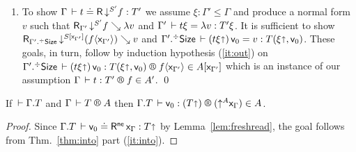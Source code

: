 \documentclass[acmsmall%
]{acmart}\settopmatter{printfolios=true}
\makeatletter
\newcommand{\LONGVERSION}[1]{}
\newenvironment{proof*}[1][\proofname]{\par
  \normalfont \topsep6\p@\@plus6\p@\relax
  \trivlist
  \item[\@proofindent\hskip\labelsep
        {\@proofnamefont #1\@addpunct{.}}]\ignorespaces
}{%
  \endtrivlist\@endpefalse
}
\makeatother
\begin{document}
{\begin{proof*}
\begin{caselist}
\begin{enumerate}
\item %
To show $\Gamma \,\vdash t \doteq \mathsf{R}\, \mathord{\downarrow^{S'}} f : T'$ we assume $\xi : \Gamma' \leq \Gamma$ and
produce a normal form $v$ such that $\mathsf{R}_{\Gamma'} \, \mathord{\downarrow^{S'}}f \searrow \lambda v$ and
$\Gamma' \,\vdash t\xi = \lambda v : T'\xi$.
It is sufficient to show
$\mathsf{R}_{\Gamma'.{}^{\mathord{\div}}\mathsf{Size}} \, \mathord{\downarrow^{S[\mathsf{x}_{\Gamma'}]}}(f \langle\mathsf{x}_{\Gamma'}\rangle) \searrow v$
and
$\Gamma'.{}^{\mathord{\div}}\mathsf{Size} \,\vdash (t\xi\mathord{\shortuparrow})\,\mathsf{v}_{0} = v : T(\xi\mathord{\shortuparrow},\mathsf{v}_{0})$.
These goals, in turn, follow by induction hypothesis (\ref{it:out}) on
$\LR{\erext{\Gamma'}\Size}{(t\xi\slift)\,\ind 0}{T(\xi\slift,\ind 0)}{f \ann{\var{\Gamma'}}}{A[\var{\Gamma'}]}$ which is an instance of our assumption
$\LR \Gamma t {T'} f {A'}$.
\qed
\end{enumerate}
%
\end{caselist}
\end{proof*}
\begin{corollary}
  \label{cor:fresh}
  If\/ $\,\vdash \Gamma. T$ and %
  $\RG \Gamma T A$
  then $\LR {\cext \Gamma T} {\ind 0} {(T \slift)} {(\up A \var\Gamma)} A$.
\end{corollary}
\begin{proof}
  Since $\Gamma. T \,\vdash \mathsf{v}_{0} \doteq \mathsf{R}^{\mathsf{ne}}\, \mathsf{x}_{\Gamma} : T \mathord{\shortuparrow}$
  by Lemma~\ref{lem:freshread},
  the goal follows from Thm.~\ref{thm:into} part (\ref{it:into}).
\end{proof}
} %


\LONGVERSION{
\begin{corollary}[One-to-one]
\label{cor:oneone}
\bla
\begin{enumerate}
\item
If\/ $\LRSize \Gamma a \alpha$ and $\LRSize \Gamma {a'} \alpha$ then $a = a'$.
\item
If\/ $\LRT \Gamma T A \ell$ and $\LRT \Gamma {T'} A {\ell'}$ then $\Gamma \der T = T'$.
\end{enumerate}
\end{corollary}
} %
\end{document}
